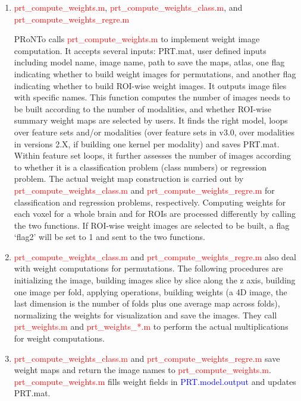 \begin{enumerate}

\item \textcolor{red}{prt\_compute\_weights.m}, \textcolor{red}{prt\_compute\_weights\_class.m}, and \textcolor{red}{prt\_compute\_weights\_regre.m}
 
PRoNTo calls \textcolor{red}{prt\_compute\_weights.m} to implement weight image computation. It accepts several inputs: PRT.mat, user defined inputs including model name, image name, path to save the maps, atlas, one flag indicating whether to build weight images for permutations, and another flag indicating whether to build ROI-wise weight images. It outputs image files with specific names. This function computes the number of images needs to be built according to the number of modalities, and whether ROI-wise summary weight maps are selected by users. It finds the right model, loops over feature sets and/or modalities (over feature sets in v3.0, over modalities in versions 2.X, if building one kernel per modality) and saves PRT.mat. Within feature set loops, it further assesses the number of images according to whether it is a classification problem (class numbers) or regression problem. The actual weight map construction is carried out by \textcolor{red}{prt\_compute\_weights\_class.m} and  \textcolor{red}{prt\_compute\_weights\_regre.m} for classification and regression problems, respectively.  Computing weights for each voxel for a whole brain and for ROIs are processed differently by calling the two functions. If ROI-wise weight images are selected to be built, a flag `flag2' will be set to 1 and sent to the two functions. 

\bi
\item \textcolor{red}{prt\_compute\_weights\_class.m} and \textcolor{red}{prt\_compute\_weights\_regre.m} also deal with weight computations for permutations. The following procedures are initializing the image, building images slice by slice along the z axis, building one image per fold, applying operations, building weights (a 4D image, the last dimension is the number of folds plus one average map across folds), normalizing the weights for visualization and save the images. They call \textcolor{red}{prt\_weights.m} and \textcolor{red}{prt\_weights\_*.m} to perform the actual multiplications for weight computations.  

\item \textcolor{red}{prt\_compute\_weights\_class.m} and \textcolor{red}{prt\_compute\_weights\_regre.m} save weight maps and return the image names to \textcolor{red}{prt\_compute\_weights.m}. \textcolor{red}{prt\_compute\_weights.m} fills weight fields in \textcolor{blue}{PRT.model.output} and updates PRT.mat. 
\ei 


\end{enumerate}
